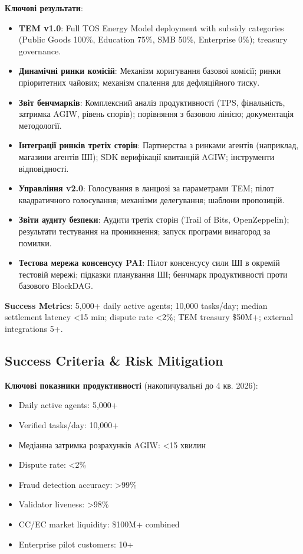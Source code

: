 \documentclass[11pt]{article}
\begin{document}
\textbf{Ключові результати}:
\begin{itemize}[noitemsep]
  \item \textbf{TEM v1.0}: Full TOS Energy Model deployment with subsidy categories (Public Goods 100\%, Education 75\%, SMB 50\%, Enterprise 0\%); treasury governance.
  \item \textbf{Динамічні ринки комісій}: Механізм коригування базової комісії; ринки пріоритетних чайових; механізм спалення для дефляційного тиску.
  \item \textbf{Звіт бенчмарків}: Комплексний аналіз продуктивності (TPS, фінальність, затримка AGIW, рівень спорів); порівняння з базовою лінією; документація методології.
  \item \textbf{Інтеграції ринків третіх сторін}: Партнерства з ринками агентів (наприклад, магазини агентів ШІ); SDK верифікації квитанцій AGIW; інструменти відповідності.
  \item \textbf{Управління v2.0}: Голосування в ланцюзі за параметрами TEM; пілот квадратичного голосування; механізми делегування; шаблони пропозицій.
  \item \textbf{Звіти аудиту безпеки}: Аудити третіх сторін (Trail of Bits, OpenZeppelin); результати тестування на проникнення; запуск програми винагород за помилки.
  \item \textbf{Тестова мережа консенсусу PAI}: Пілот консенсусу сили ШІ в окремій тестовій мережі; підказки планування ШІ; бенчмарк продуктивності проти базового BlockDAG.
\end{itemize}

\textbf{Success Metrics}: 5,000+ daily active agents; 10,000 tasks/day; median settlement latency <15 min; dispute rate <2\%; TEM treasury \$50M+; external integrations 5+.

\subsection{Success Criteria \& Risk Mitigation}

\textbf{Ключові показники продуктивності} (накопичувальні до 4 кв. 2026):
\begin{itemize}[noitemsep]
  \item Daily active agents: 5,000+
  \item Verified tasks/day: 10,000+
  \item Медіанна затримка розрахунків AGIW: <15 хвилин
  \item Dispute rate: <2\%
  \item Fraud detection accuracy: >99\%
  \item Validator liveness: >98\%
  \item CC/EC market liquidity: \$100M+ combined
  \item Enterprise pilot customers: 10+
\end{itemize}
\end{document}
